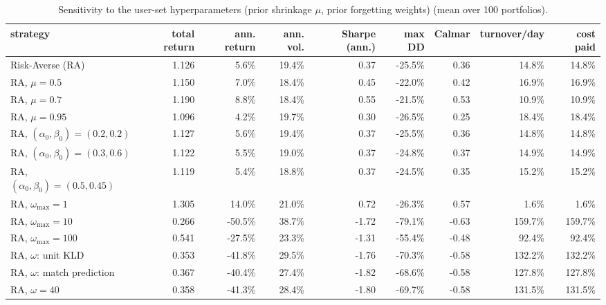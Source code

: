 \begin{table}[ht!]
\centering
\footnotesize
\setlength{\tabcolsep}{4pt}
\begin{tabular}{lrrrrrrrr}
\hline
strategy & total return & ann. return & ann. vol. & Sharpe (ann.) & max DD & Calmar & turnover/day & cost paid \\
\hline
Risk-Averse (RA) & 1.126 & 5.6\% & 19.4\% & 0.37 & -25.5\% & 0.36 & 14.8\% & 14.8\% \\
RA, $\mu=0.5$ & 1.150 & 7.0\% & 18.4\% & 0.45 & -22.0\% & 0.42 & 16.9\% & 16.9\% \\
RA, $\mu=0.7$ & 1.190 & 8.8\% & 18.4\% & 0.55 & -21.5\% & 0.53 & 10.9\% & 10.9\% \\
RA, $\mu=0.95$ & 1.096 & 4.2\% & 19.7\% & 0.30 & -26.5\% & 0.25 & 18.4\% & 18.4\% \\
RA, $(\alpha_0,\beta_0)=(0.2,0.2)$ & 1.127 & 5.6\% & 19.4\% & 0.37 & -25.5\% & 0.36 & 14.8\% & 14.8\% \\
RA, $(\alpha_0,\beta_0)=(0.3,0.6)$ & 1.122 & 5.5\% & 19.0\% & 0.37 & -24.8\% & 0.37 & 14.9\% & 14.9\% \\
RA, $(\alpha_0,\beta_0)=(0.5,0.45)$ & 1.119 & 5.4\% & 18.8\% & 0.37 & -24.5\% & 0.35 & 15.2\% & 15.2\% \\
RA, $\omega_{\max}=1$ & 1.305 & 14.0\% & 21.0\% & 0.72 & -26.3\% & 0.57 & 1.6\% & 1.6\% \\
RA, $\omega_{\max}=10$ & 0.266 & -50.5\% & 38.7\% & -1.72 & -79.1\% & -0.63 & 159.7\% & 159.7\% \\
RA, $\omega_{\max}=100$ & 0.541 & -27.5\% & 23.3\% & -1.31 & -55.4\% & -0.48 & 92.4\% & 92.4\% \\
RA, $\omega$: unit KLD & 0.353 & -41.8\% & 29.5\% & -1.76 & -70.3\% & -0.58 & 132.2\% & 132.2\% \\
RA, $\omega$: match prediction & 0.367 & -40.4\% & 27.4\% & -1.82 & -68.6\% & -0.58 & 127.8\% & 127.8\% \\
RA, $\omega=40$ & 0.358 & -41.3\% & 28.4\% & -1.80 & -69.7\% & -0.58 & 131.5\% & 131.5\% \\
\hline
\end{tabular}
\caption{Sensitivity to the user-set hyperparameters (prior shrinkage $\mu$, prior forgetting weights) (mean over 100 portfolios).}
\label{tab:sensitivity}
\end{table}
